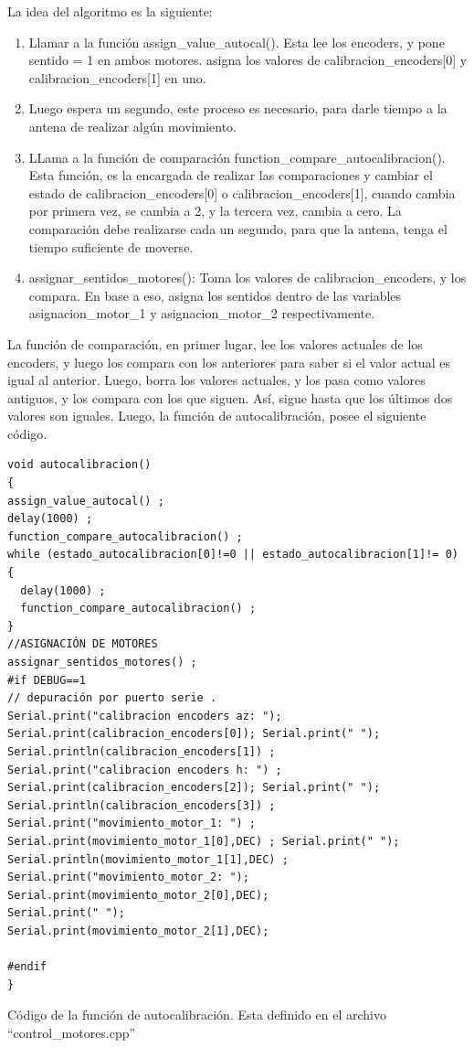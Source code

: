 La idea del algoritmo es la siguiente: 
\begin{enumerate}
	\item Llamar a la función assign\_value\_autocal(). Esta lee los encoders, y pone sentido = 1 en ambos motores. asigna los valores de calibracion\_encoders[0] y  calibracion\_encoders[1] en uno.  
	\item Luego espera un segundo, este proceso es necesario, para darle tiempo a la antena de realizar algún movimiento. 
	\item LLama a la función de comparación function\_compare\_autocalibracion(). Esta función, es la encargada de realizar las comparaciones y cambiar el estado de calibracion\_encoders[0] o calibracion\_encoders[1], cuando cambia por primera vez, se cambia a 2, y la tercera vez, cambia a cero. La comparación debe realizarse cada un segundo, para que la antena, tenga el tiempo suficiente de moverse.  
	\item assignar\_sentidos\_motores(): Toma los valores de calibracion\_encoders, y los compara. En base a eso, asigna los sentidos dentro de las variables asignacion\_motor\_1 y asignacion\_motor\_2 respectivamente. 
\end{enumerate}


La función de comparación, en primer lugar, lee los valores actuales de los encoders, y luego los compara con los anteriores para saber si el valor actual es igual al anterior. Luego, borra los valores actuales, y los pasa como valores antiguos, y los compara con los que siguen. Así, sigue hasta que los últimos dos valores son iguales. Luego, la función de autocalibración, posee el siguiente código.  

\begin{listing}[ht]
	\begin{verbatim}
void autocalibracion()
{
assign_value_autocal() ;
delay(1000) ; 
function_compare_autocalibracion() ; 
while (estado_autocalibracion[0]!=0 || estado_autocalibracion[1]!= 0)
{
  delay(1000) ;     
  function_compare_autocalibracion() ;             
}
//ASIGNACIÓN DE MOTORES 
assignar_sentidos_motores() ; 
#if DEBUG==1
// depuración por puerto serie . 
Serial.print("calibracion encoders az: ");                   
Serial.print(calibracion_encoders[0]); Serial.print(" ");
Serial.println(calibracion_encoders[1]) ;
Serial.print("calibracion encoders h: ") ;
Serial.print(calibracion_encoders[2]); Serial.print(" ");
Serial.println(calibracion_encoders[3]) ;
Serial.print("movimiento_motor_1: ") ; 
Serial.print(movimiento_motor_1[0],DEC) ; Serial.print(" "); 
Serial.println(movimiento_motor_1[1],DEC) ;
Serial.print("movimiento_motor_2: ");
Serial.print(movimiento_motor_2[0],DEC); 
Serial.print(" ");
Serial.print(movimiento_motor_2[1],DEC); 			

#endif    	
}
\end{verbatim}
\caption{Código de la función de autocalibración. Esta definido en el archivo ``control\_motores.cpp''}
\label{cod:autocalibracion}
\end{listing}

